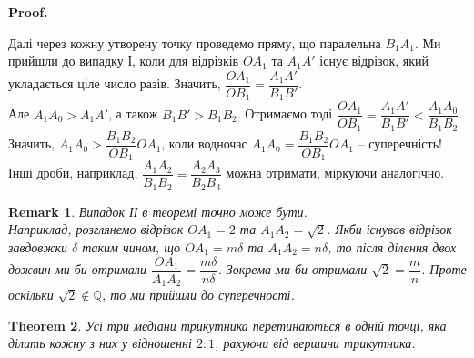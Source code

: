 \documentclass[a4paper, 10pt]{article}
\makeatletter
\def\qed{$\blacksquare$}
\theoremstyle{theoremdd}
\newtheorem{theorem}{Theorem}[subsection]
\theoremstyle{theoremdd}
\theoremstyle{theoremdd}
\theoremstyle{theoremdd}
\theoremstyle{theoremdd}
\theoremstyle{theoremdd}
\theoremstyle{theoremdd}
\newtheorem{remark}[theorem]{Remark}
\theoremstyle{theoremdd}
\theoremstyle{theoremdd}
\renewenvironment{proof}[1][Proof.\\]{\par
\pushQED{\hfill \qed}%
\normalfont \topsep6\p@\@plus6\p@\relax
\trivlist
\item\relax
{\bfseries
#1\@addpunct{.}}\hspace\labelsep\ignorespaces
}{%
\popQED\endtrivlist\@endpefalse
}
\makeatother
\begin{document}
\begin{proof}
\begin{figure}[H]
\end{figure}
Далі через кожну утворену точку проведемо пряму, що паралельна $B_1A_1$. Ми прийшли до випадку І, коли для відрізків $OA_1$ та $A_1A'$ існує відрізок, який укладається ціле число разів. Значить, $\dfrac{OA_1}{OB_1} = \dfrac{A_1A'}{B_1B'}$.\\
Але $A_1A_0 > A_1A'$, а також $B_1B' > B_1B_2$. Отримаємо тоді $\dfrac{OA_1}{OB_1} = \dfrac{A_1A'}{B_1B'} < \dfrac{A_1A_0}{B_1B_2}$. Значить, $A_1A_0 > \dfrac{B_1B_2}{OB_1}OA_1$, коли водночас $A_1A_0 = \dfrac{B_1B_2}{OB_1} OA_1$ -- суперечність!
\bigskip \\
Інші дроби, наприклад, $\dfrac{A_1A_2}{B_1B_2} = \dfrac{A_2A_3}{B_2B_3}$ можна отримати, міркуючи аналогічно. 
\end{proof}

\begin{remark}
Випадок ІІ в теоремі точно може бути. \\
Наприклад, розглянемо відрізок $OA_1 = 2$ та $A_1A_2 = \sqrt{2}$. Якби існував відрізок завдовжки $\delta$ таким чином, що $OA_1 = m \delta$ та $A_1A_2 = n \delta$, то після ділення двох дожвин ми би отримали $\dfrac{OA_1}{A_1A_2} = \dfrac{m \delta}{n \delta}$. Зокрема ми би отримали $\sqrt{2} = \dfrac{m}{n}$. Проте оскільки $\sqrt{2} \notin \mathbb{Q}$, то ми прийшли до суперечності.
\end{remark}

\begin{theorem}
Усі три медіани трикутника перетинаються в одній точці, яка ділить кожну з них у відношенні $2 : 1$, рахуючи від вершини трикутника.
\end{theorem}
\end{document}
